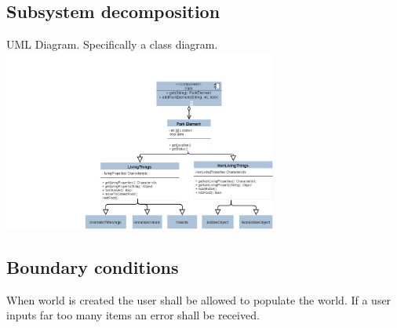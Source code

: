 \documentclass[11pt]{article}
\begin{document}
\subsection{Subsystem decomposition}
UML Diagram.  Specifically a class diagram.
\centering
\includegraphics[width=90mm]{ENSE 374 lab diagram.png}
\subsection{Boundary conditions}
When world is created the user shall be allowed to populate the world. If a user inputs far too many items an error shall be received.

 
\end{document}
